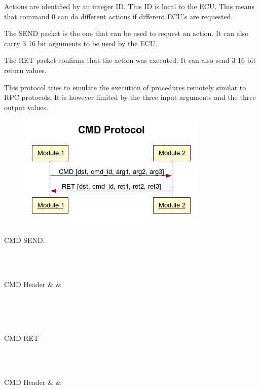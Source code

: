 \documentclass[11pt, a4paper]{article}
\begin{document}
{Actions are identified by an integer ID. This ID is local to the ECU. This means that command 0 can do different actions if different ECU's are requested.

The SEND packet is the one that can be used to request an action. It can also carry 3 16 bit arguments to be used by the ECU.

The RET packet confirms that the action was executed. It can also send 3 16 bit return values.

This protocol tries to emulate the execution of procedures remotely similar to RPC protocols. It is however limited by the three input arguments and the three output values.

\begin{figure}[h!]
	\centering
	\includegraphics[width=0.6\linewidth]{cmd_protocol.png}
	\caption{\uname}%
	\label{fig:name}
\end{figure}

CMD SEND. 
\\\\
\begin{bytefield}[bitwidth=2.2em]{16}
	 \\
	\begin{rightwordgroup}{CMD Header}
		 &  & 
	\end{rightwordgroup} \\
	 \\
	 \\
\end{bytefield}

CMD RET
\\\\
\begin{bytefield}[bitwidth=2.2em]{16}
	 \\
	\begin{rightwordgroup}{CMD Header}
		 &  & 
	\end{rightwordgroup} \\
	 \\
	 \\
\end{bytefield}

}
\end{document}
